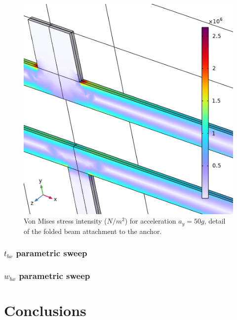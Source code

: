 \documentclass[lettersize,journal]{IEEEtran}
\begin{document}
    \begin{figure}[!h]
        \centering
        \includegraphics[width=1.0\linewidth]{stress_ay_detail}
        \caption{Von Mises stress intensity (\(N/m^2\)) for acceleration \(a_y=50g\), detail of the folded beam attachment to the anchor.}
        \label{fig:stress_ay_det}
    \end{figure}
    
    \bigskip
    \subsubsection{\(t_{bx}\) parametric sweep}
    
    \bigskip
    \subsubsection{\(w_{bx}\) parametric sweep}
        
    
    \section{Conclusions}
    
    \printbibliography
\end{document}
